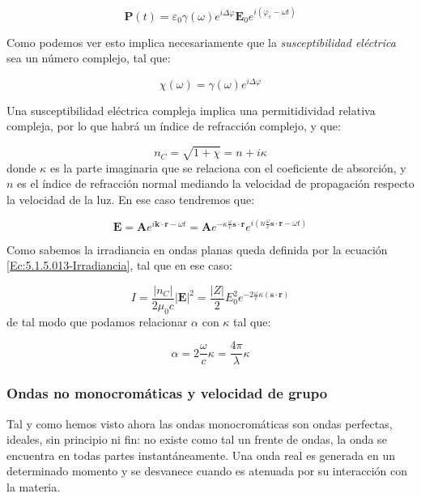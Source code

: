 \documentclass[12pt,a4paper]{article}
\newcommand{\parentesis}[1]{\left( #1  \right)}
\newcommand{\En}{\mathbf{E}}
\newcommand{\kn}{\mathbf{k}}
\newcommand{\rn}{\mathbf{r}}
\newcommand{\An}{\mathbf{A}}
\newcommand{\Pn}{\mathbf{P}}
\newcommand{\sn}{\mathbf{s}}
\numberwithin{equation}{section}
\numberwithin{figure}{section}
\begin{document}
\begin{equation}
\Pn (t) =  \varepsilon_0 \gamma (\omega) e^{i \Delta \varphi} \En_0 e^{i (\varphi_e - \omega t)}
\end{equation}

Como podemos ver esto implica necesariamente que la \textit{susceptibilidad eléctrica} sea un número complejo, tal que:

\begin{equation}
\chi (\omega) = \gamma (\omega) e^{i \Delta \varphi}
\end{equation}

Una susceptibilidad eléctrica compleja implica una permitidividad relativa compleja, por lo que habrá un índice de refracción complejo, y que:

\begin{equation}
n_C = \sqrt{1+\chi} = n + i \kappa
\end{equation}
donde $\kappa$ es la parte imaginaria que se relaciona con el coeficiente de absorción, y $n$ es el índice de refracción normal mediando la velocidad de propagación respecto la velocidad de la luz. En ese caso tendremos que:

\begin{equation}
\En = \An e^{i \kn \cdot \rn - \omega t} = \An e^{-\kappa \frac{\omega}{c} \sn \cdot \rn} e^{i \parentesis{n \frac{\omega}{c} \sn \cdot \rn - \omega t}}
\end{equation}

Como sabemos la irradiancia en ondas planas queda definida por la ecuación \ref{Ec:5.1.5.013-Irradiancia}, tal que en ese caso:

\begin{equation}
I = \dfrac{|n_C|}{2 \mu_0 c} |\En|^2  = \dfrac{|Z|}{2} E_0^2 e^{-2 \frac{\omega}{c} \kappa ( \sn \cdot \rn)}
\end{equation}
de tal modo que podamos relacionar $\alpha$ con $\kappa$ tal que:

\begin{equation}
\alpha = 2 \dfrac{\omega}{c} \kappa = \dfrac{4 \pi}{\lambda
} \kappa
\end{equation}

\subsubsection{Ondas no monocromáticas y velocidad de grupo}

Tal y como hemos visto ahora las ondas monocromáticas son ondas perfectas, ideales, sin principio ni fin: no existe como tal un frente de ondas, la onda se encuentra en todas partes instantáneamente. Una onda real es generada en un determinado momento y se desvanece cuando es atenuada por su interacción con la materia.  \\
\end{document}

